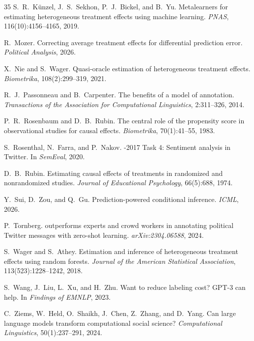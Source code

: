 \documentclass[11pt,twocolumn]{article}
\begin{document}
\begin{thebibliography}{35}
S.~R.~K\"unzel, J.~S.~Sekhon, P.~J.~Bickel, and B.~Yu.
\newblock Metalearners for estimating heterogeneous treatment effects using machine learning.
\newblock \emph{PNAS}, 116(10):4156--4165, 2019.

R.~Mozer.
\newblock Correcting average treatment effects for differential prediction error.
\newblock \emph{Political Analysis}, 2026.

X.~Nie and S.~Wager.
\newblock Quasi-oracle estimation of heterogeneous treatment effects.
\newblock \emph{Biometrika}, 108(2):299--319, 2021.

R.~J.~Passonneau and B.~Carpenter.
\newblock The benefits of a model of annotation.
\newblock \emph{Transactions of the Association for Computational Linguistics}, 2:311--326, 2014.

P.~R.~Rosenbaum and D.~B.~Rubin.
\newblock The central role of the propensity score in observational studies for causal effects.
\newblock \emph{Biometrika}, 70(1):41--55, 1983.

S.~Rosenthal, N.~Farra, and P.~Nakov.
-2017 Task 4: Sentiment analysis in {T}witter.
\newblock In \emph{SemEval}, 2020.

D.~B.~Rubin.
\newblock Estimating causal effects of treatments in randomized and nonrandomized studies.
\newblock \emph{Journal of Educational Psychology}, 66(5):688, 1974.

Y.~Sui, D.~Zou, and Q.~Gu.
\newblock Prediction-powered conditional inference.
\newblock \emph{ICML}, 2026.

P.~Tornberg.
 outperforms experts and crowd workers in annotating political {Twitter} messages with zero-shot learning.
\newblock \emph{arXiv:2304.06588}, 2024.

S.~Wager and S.~Athey.
\newblock Estimation and inference of heterogeneous treatment effects using random forests.
\newblock \emph{Journal of the American Statistical Association}, 113(523):1228--1242, 2018.

S.~Wang, J.~Liu, L.~Xu, and H.~Zhu.
\newblock Want to reduce labeling cost? {GPT-3} can help.
\newblock In \emph{Findings of EMNLP}, 2023.

C.~Ziems, W.~Held, O.~Shaikh, J.~Chen, Z.~Zhang, and D.~Yang.
\newblock Can large language models transform computational social science?
\newblock \emph{Computational Linguistics}, 50(1):237--291, 2024.

\end{thebibliography}
\end{document}

